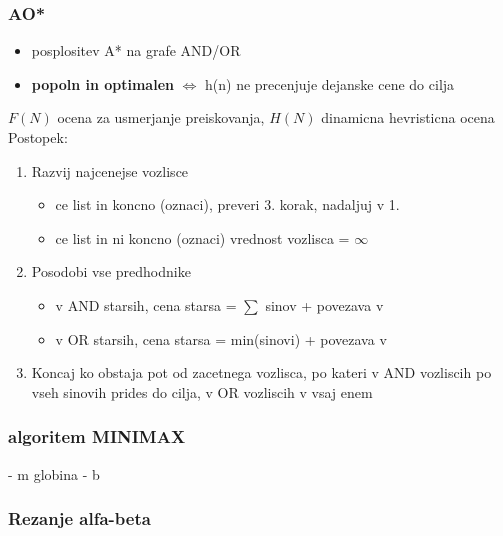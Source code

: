\subsubsection{AO*}
\begin{itemize}[noitemsep,topsep=0pt,leftmargin=*]
    \item posplositev A* na grafe AND/OR
    \item \textbf{popoln in optimalen} $\Leftrightarrow$ h(n) ne precenjuje dejanske cene do cilja
\end{itemize}
$F(N)$ ocena za usmerjanje preiskovanja, $H(N)$ dinamicna hevristicna ocena\\
Postopek:
\begin{enumerate}[noitemsep,topsep=0pt,leftmargin=*]
    \item Razvij najcenejse vozlisce
    \begin{itemize}[noitemsep,topsep=0pt,leftmargin=*]
        \item ce list in koncno (oznaci), preveri 3. korak, nadaljuj v 1.
        \item ce list in ni koncno (oznaci) vrednost vozlisca = $\infty$
    \end{itemize}
    \item Posodobi vse predhodnike
    \begin{itemize}[noitemsep,topsep=0pt,leftmargin=*]
        \item v AND starsih, cena starsa = $\sum$ sinov + povezava v
        \item v OR starsih, cena starsa = min(sinovi) + povezava v
    \end{itemize}
    \item Koncaj ko obstaja pot od zacetnega vozlisca, po kateri v AND vozliscih po vseh sinovih prides do cilja, v OR vozliscih v vsaj enem
\end{enumerate}

\subsubsection{algoritem MINIMAX}
- m globina
- b 

\subsubsection{Rezanje alfa-beta}
